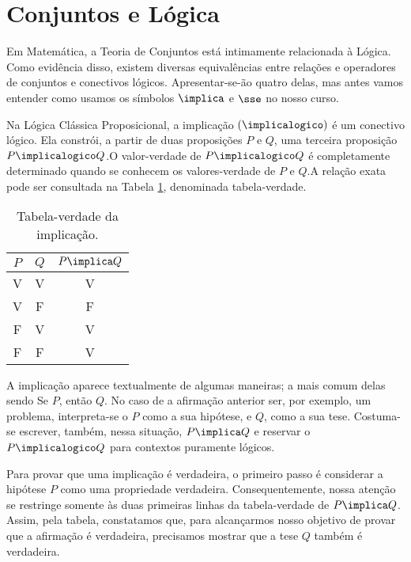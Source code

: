 \section{Conjuntos e Lógica}

Em Matemática, a Teoria de Conjuntos está intimamente relacionada à Lógica. Como evidência disso, existem diversas equivalências entre relações e operadores de conjuntos e conectivos lógicos. Apresentar-se-ão quatro delas, mas antes vamos entender como usamos os símbolos $\implica$ e $\sse$ no nosso curso.

Na Lógica Clássica Proposicional, a implicação $(\implicalogico)$ é um conectivo lógico. Ela constrói, a partir de duas proposições $P$ e $Q$, uma terceira proposição $P \implicalogico Q$.O valor-verdade de $P \implicalogico Q$ é completamente determinado quando se conhecem os valores-verdade de $P$ e $Q$.A relação exata pode ser consultada na Tabela \ref{tbl:implicacao}, denominada tabela-verdade.

\begin{table}[h]
	\centering
	\begin{tabular}{cc|c}
		$P$		& $Q$		& $P \implica Q$ \\ \hline
		V		& V			& V			     \\
		V		& F			& F			     \\
		F		& V			& V			     \\
		F		& F			& V			     \\	
	\end{tabular}
	\caption{Tabela-verdade da implicação.}
	\label{tbl:implicacao}
\end{table}

A implicação aparece textualmente de algumas maneiras; a mais comum delas sendo \abreaspas Se $P$, então $Q$\fechaaspas.
No caso de a afirmação anterior ser, por exemplo, um problema, interpreta-se o $P$ como a sua hipótese, e $Q$, como a sua tese. Costuma-se escrever, também, nessa situação, $P \implica Q$ e reservar o $P \implicalogico Q$ para contextos puramente lógicos.

Para provar que uma implicação é verdadeira, o primeiro passo é considerar a hipótese $P$ como uma propriedade verdadeira.
Consequentemente, nossa atenção se restringe somente às duas primeiras linhas da tabela-verdade de $P \implica Q$.
Assim, pela tabela, constatamos que, para alcançarmos nosso objetivo de provar que a afirmação  é verdadeira, precisamos mostrar que a tese $Q$ também é verdadeira.

